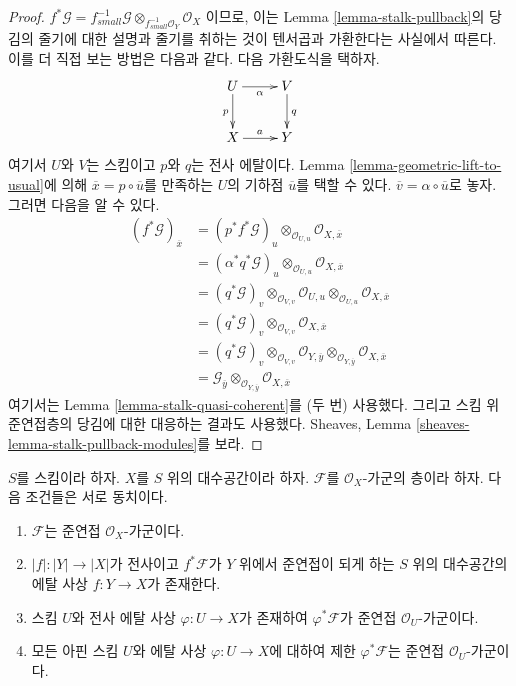 \begin{proof}
$f^*\mathcal{G} =
f_{small}^{-1}\mathcal{G} \otimes_{f_{small}^{-1}\mathcal{O}_Y} \mathcal{O}_X$
이므로, 이는 Lemma \ref{lemma-stalk-pullback}의 당김의 줄기에 대한
설명과 줄기를 취하는 것이 텐서곱과 가환한다는 사실에서 따른다.
이를 더 직접 보는 방법은 다음과 같다. 다음 가환도식을 택하자.
$$
\xymatrix{
U \ar[d]_p \ar[r]_\alpha  & V \ar[d]^q \\
X \ar[r]^a & Y
}
$$
여기서 $U$와 $V$는 스킴이고 $p$와 $q$는 전사 에탈이다.
Lemma \ref{lemma-geometric-lift-to-usual}에 의해
$\overline{x} = p \circ \overline{u}$를 만족하는 $U$의 기하점
$\overline{u}$를 택할 수 있다. $\overline{v} = \alpha \circ \overline{u}$로
놓자. 그러면 다음을 알 수 있다.
\begin{align*}
(f^*\mathcal{G})_{\overline{x}} & =
(p^*f^*\mathcal{G})_u \otimes_{\mathcal{O}_{U, u}}
\mathcal{O}_{X, \overline{x}} \\
& = (\alpha^*q^*\mathcal{G})_u \otimes_{\mathcal{O}_{U, u}}
\mathcal{O}_{X, \overline{x}} \\
& = (q^*\mathcal{G})_v \otimes_{\mathcal{O}_{V, v}}
\mathcal{O}_{U, u} \otimes_{\mathcal{O}_{U, u}}
\mathcal{O}_{X, \overline{x}} \\
& = (q^*\mathcal{G})_v \otimes_{\mathcal{O}_{V, v}}
\mathcal{O}_{X, \overline{x}} \\
& = (q^*\mathcal{G})_v \otimes_{\mathcal{O}_{V, v}}
\mathcal{O}_{Y, \overline{y}} \otimes_{\mathcal{O}_{Y, \overline{y}}}
\mathcal{O}_{X, \overline{x}} \\
& = \mathcal{G}_{\overline{y}} \otimes_{\mathcal{O}_{Y, \overline{y}}}
\mathcal{O}_{X, \overline{x}}
\end{align*}
여기서는 Lemma \ref{lemma-stalk-quasi-coherent}를 (두 번) 사용했다.
그리고 스킴 위 준연접층의 당김에 대한 대응하는 결과도 사용했다.
Sheaves, Lemma \ref{sheaves-lemma-stalk-pullback-modules}를 보라.
\end{proof}

\begin{lemma}
\label{lemma-characterize-quasi-coherent}
$S$를 스킴이라 하자. $X$를 $S$ 위의 대수공간이라 하자.
$\mathcal{F}$를 $\mathcal{O}_X$-가군의 층이라 하자.
다음 조건들은 서로 동치이다.
\begin{enumerate}
\item $\mathcal{F}$는 준연접 $\mathcal{O}_X$-가군이다.
\item $|f| : |Y| \to |X|$가 전사이고 $f^*\mathcal{F}$가 $Y$ 위에서
준연접이 되게 하는 $S$ 위의 대수공간의 에탈 사상
$f : Y \to X$가 존재한다.
\item 스킴 $U$와 전사 에탈 사상 $\varphi : U \to X$가 존재하여
$\varphi^*\mathcal{F}$가 준연접 $\mathcal{O}_U$-가군이다.
\item 모든 아핀 스킴 $U$와 에탈 사상 $\varphi : U \to X$에 대하여
제한 $\varphi^*\mathcal{F}$는 준연접 $\mathcal{O}_U$-가군이다.
\end{enumerate}
\end{lemma}


